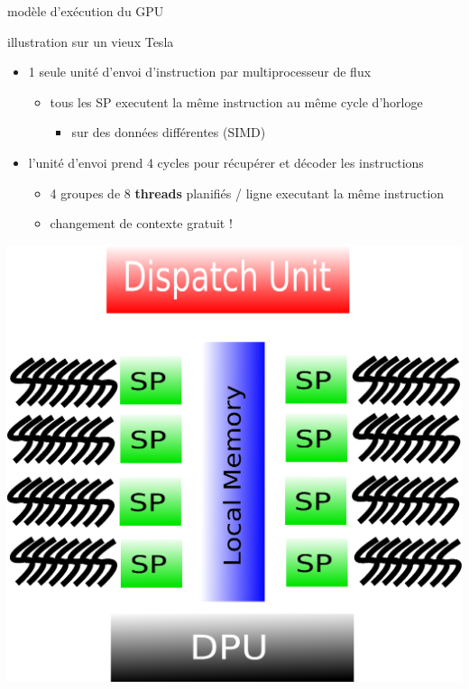 \documentclass[11pt,mathserif]{beamer}
\begin{document}
\begin{frame}{modèle d'exécution du GPU}
  \begin{flushright}
    illustration sur un vieux Tesla
  \end{flushright}
\begin{minipage}[c]{0.49\linewidth}
\begin{itemize}
  \item 1 seule unité d'envoi d'instruction par multiprocesseur de flux
    \begin{itemize}
      \item tous les SP executent la même instruction au même cycle d'horloge
        \begin{itemize}
          \item sur des données différentes (SIMD)
        \end{itemize}
    \end{itemize}
  \item l'unité d'envoi prend 4 cycles pour récupérer et décoder les instructions
    \begin{itemize}
      \item 4 groupes de 8 {\bf threads} planifiés / ligne
    executant la même instruction
      \item changement de contexte gratuit !
    \end{itemize}
\end{itemize}
\end{minipage}
\begin{minipage}[c]{0.49\linewidth}
\begin{center}
  \includegraphics[width=0.9\linewidth]{fig/GPUArchi8Thread.eps}
\end{center}
\end{minipage}
\end{frame}
\end{document}
